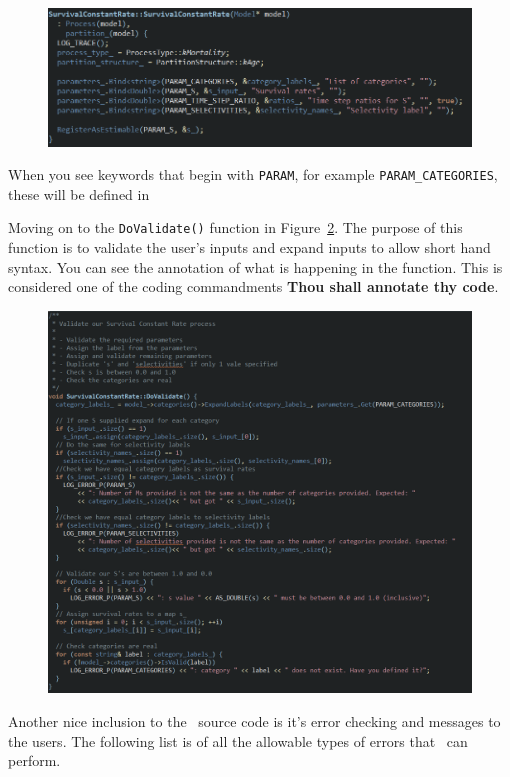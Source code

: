 \begin{figure}[!ht]
	\centering
	\includegraphics[scale=0.8]{Figures/constructor.png}
	\caption{}\label{fig:constructor}
\end{figure}
When you see keywords that begin with \texttt{PARAM}, for example \texttt{PARAM\_CATEGORIES}, these will be defined in 

Moving on to the \texttt{DoValidate()} function in Figure~\ref{fig:validate}. The purpose of this function is to validate the {\color{red}user's} inputs and expand inputs to allow short hand syntax. You can see the annotation of what is happening in the function. This is considered one of the coding commandments \textbf{Thou shall annotate thy code}.
\begin{figure}[!ht]
	\centering
	\includegraphics[scale=0.7]{Figures/validate.png}
	\caption{}\label{fig:validate}
\end{figure}

Another nice inclusion to the \CNAME\ source code is it's error checking and messages to the users. The following list is of all the allowable types of errors that \CNAME\ can perform.

